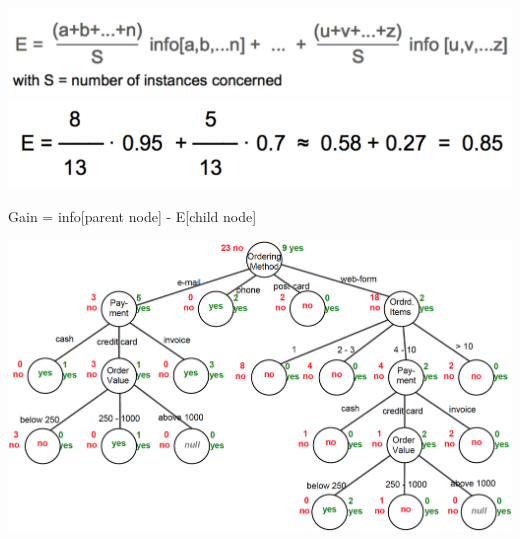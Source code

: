 \begin{breakbox}
\begin{breakbox}
\begin{center}
\includegraphics[width=.15\textwidth]{slides_images/entropy}
\includegraphics[width=.15\textwidth]{slides_images/entropy_example}
\end{center}
\end{breakbox}

\begin{breakbox}
\newline Gain = info[parent node] - E[child node]
\end{breakbox}

\begin{center}
\includegraphics[width=.15\textwidth]{slides_images/id3_tree}
\end{center}

\end{breakbox}

